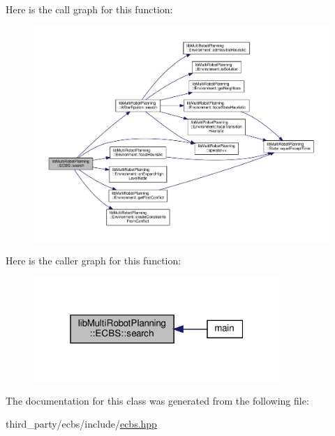 Here is the call graph for this function\+:
\nopagebreak
\begin{figure}[H]
\begin{center}
\leavevmode
\includegraphics[width=350pt]{classlib_multi_robot_planning_1_1_e_c_b_s_afecd0fb22e9070ee79391a6850c15f3d_cgraph}
\end{center}
\end{figure}
Here is the caller graph for this function\+:
\nopagebreak
\begin{figure}[H]
\begin{center}
\leavevmode
\includegraphics[width=265pt]{classlib_multi_robot_planning_1_1_e_c_b_s_afecd0fb22e9070ee79391a6850c15f3d_icgraph}
\end{center}
\end{figure}


The documentation for this class was generated from the following file\+:\begin{DoxyCompactItemize}
\item 
third\+\_\+party/ecbs/include/\hyperlink{ecbs_8hpp}{ecbs.\+hpp}\end{DoxyCompactItemize}
